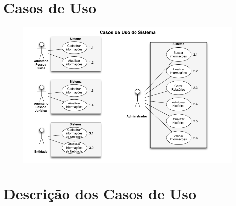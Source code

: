 \section{Casos de Uso}
\begin{figure}[h]
  \begin{center}
    \includegraphics[scale=.6]{casosDeUsoJCI.png}
   \end{center}    
\end{figure}

\newpage
\section{Descrição dos Casos de Uso}
